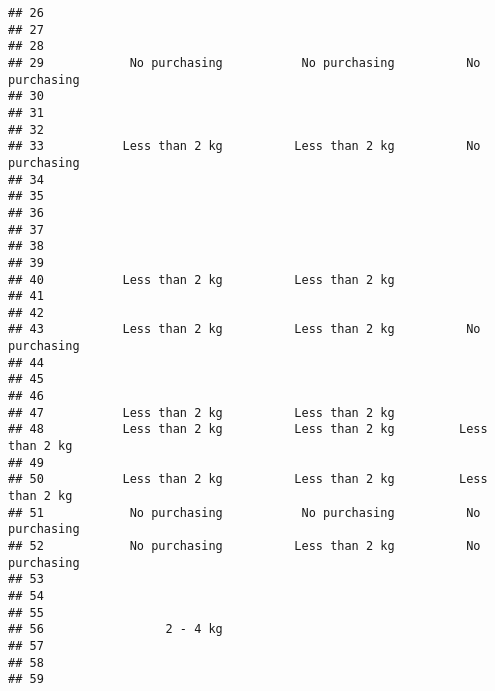 \documentclass[
]{article}
\begin{document}
\begin{verbatim}
## 26                                                                        
## 27                                                                        
## 28                                                                        
## 29            No purchasing           No purchasing          No purchasing
## 30                                                                        
## 31                                                                        
## 32                                                                        
## 33           Less than 2 kg          Less than 2 kg          No purchasing
## 34                                                                        
## 35                                                                        
## 36                                                                        
## 37                                                                        
## 38                                                                        
## 39                                                                        
## 40           Less than 2 kg          Less than 2 kg                       
## 41                                                                        
## 42                                                                        
## 43           Less than 2 kg          Less than 2 kg          No purchasing
## 44                                                                        
## 45                                                                        
## 46                                                                        
## 47           Less than 2 kg          Less than 2 kg                       
## 48           Less than 2 kg          Less than 2 kg         Less than 2 kg
## 49                                                                        
## 50           Less than 2 kg          Less than 2 kg         Less than 2 kg
## 51            No purchasing           No purchasing          No purchasing
## 52            No purchasing          Less than 2 kg          No purchasing
## 53                                                                        
## 54                                                                        
## 55                                                                        
## 56                 2 - 4 kg                                               
## 57                                                                        
## 58                                                                        
## 59                                                                        

\end{verbatim}
\end{document}
